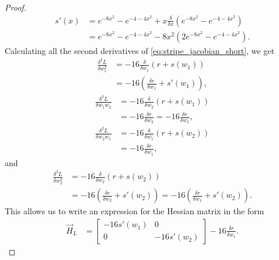 \begin{proof}
\begin{align*}
        s'(x)
        &= e^{-8 x^2} - e^{-4-4x^2}
        + x \frac{\delta}{\delta x} \left(e^{-8 x^2} - e^{-4-4 x^2}\right)\\
        &= e^{-8 x^2} - e^{-4-4x^2}
        - 8 x^2 \left(2 e^{-8 x^2} - e^{-4-4 x^2}\right).
    \end{align*}
    Calculating all the second derivatives of \ref{eq:stripe_jacobian_short}, we get
    \begin{align*}
        \frac{\delta^2 L}{\delta w_1^2}
        &= -16 \frac{\delta}{\delta w_1} \left( r + s(w_1) \right) \\
        &= -16 \left( \frac{\delta r}{\delta w_1} + s'(w_1) \right),
    \end{align*}
    \begin{align*}
        \frac{\delta^2 L}{\delta w_1 w_2}
        &= -16 \frac{\delta}{\delta w_2} \left( r + s(w_1) \right) \\
        &= -16 \frac{\delta r}{\delta w_2}
         = -16 \frac{\delta r}{\delta w_1},
    \end{align*}
    \begin{align*}
        \frac{\delta^2 L}{\delta w_2 w_1}
        &= -16 \frac{\delta}{\delta w_1} \left( r + s(w_2) \right) \\
        &= -16 \frac{\delta r}{\delta w_1},
    \end{align*}
    and
    \begin{align*}
        \frac{\delta^2 L}{\delta w_2^2}
        &= -16 \frac{\delta}{\delta w_2} \left( r + s(w_2) \right) \\
        &= -16 \left( \frac{\delta r}{\delta w_2} + s'(w_2) \right)
         = -16 \left( \frac{\delta r}{\delta w_1} + s'(w_2) \right).
    \end{align*}
    This allows us to write an expression for the Hessian matrix in the form
    \begin{align}
        \label{eq:stripe_hessian}
        \vec{H}_L
        &=
            \begin{bmatrix}
                -16 s'(w_1) & 0 \\
                0 & -16 s'(w_2)
            \end{bmatrix}
            -16 \frac{\delta r}{\delta w_1}.
    \end{align}


\end{proof}
